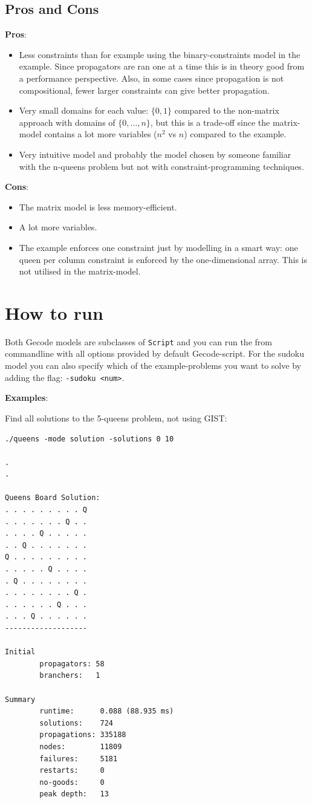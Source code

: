 \documentclass[a4paper, 11pt]{article}
\begin{document}
\subsection*{Pros and Cons}
\textbf{Pros}:
\begin{itemize}
\item Less constraints than for example using the binary-constraints model in the example. Since propagators are ran one at a time this is in theory good from a performance perspective. Also, in some cases since propagation is not compositional, fewer larger constraints can give better propagation.
\item Very small domains for each value: $\{0,1\}$ compared to the non-matrix approach with domains of $\{0, \ldots, n\}$, but this is a trade-off since the matrix-model contains a lot more variables ($n^2$ vs $n$) compared to the example.
\item Very intuitive model and probably the model chosen by someone familiar with the n-queens problem but not with constraint-programming techniques.
\end{itemize}
\textbf{Cons}:
\begin{itemize}
\item The matrix model is less memory-efficient.
\item A lot more variables.
\item The example enforces one constraint just by modelling in a smart way: one queen per column constraint is enforced by the one-dimensional array. This is not utilised in the matrix-model.
\end{itemize}
\section*{How to run}
Both Gecode models are subclasses of \texttt{Script} and you can run the from commandline with all options provided by default Gecode-script. For the sudoku model you can also specify which of the example-problems you want to solve by adding the flag: \texttt{-sudoku <num>}.

\textbf{Examples}:

Find all solutions to the 5-queens problem, not using GIST:
\begin{verbatim}
./queens -mode solution -solutions 0 10

.
.

Queens Board Solution: 
. . . . . . . . . Q 
. . . . . . . Q . . 
. . . . Q . . . . . 
. . Q . . . . . . . 
Q . . . . . . . . . 
. . . . . Q . . . . 
. Q . . . . . . . . 
. . . . . . . . Q . 
. . . . . . Q . . . 
. . . Q . . . . . . 
-------------------

Initial
        propagators: 58
        branchers:   1

Summary
        runtime:      0.088 (88.935 ms)
        solutions:    724
        propagations: 335188
        nodes:        11809
        failures:     5181
        restarts:     0
        no-goods:     0
        peak depth:   13
\end{verbatim}
\end{document}
